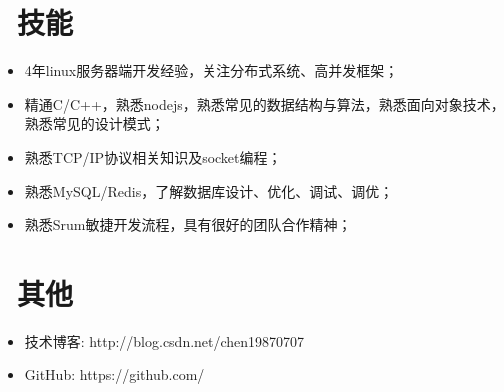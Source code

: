 \documentclass{resume}
\begin{document}

\section{\faCogs\ 技能}
\begin{itemize}[parsep=0.5ex]
  \item 4年linux服务器端开发经验，关注分布式系统、高并发框架；
  \item 精通C/C++，熟悉nodejs，熟悉常见的数据结构与算法，熟悉面向对象技术，熟悉常见的设计模式；
  \item 熟悉TCP/IP协议相关知识及socket编程；
  \item 熟悉MySQL/Redis，了解数据库设计、优化、调试、调优；
  \item 熟悉Srum敏捷开发流程，具有很好的团队合作精神；
\end{itemize}

\section{\faInfo\ 其他}
\begin{itemize}[parsep=0.5ex]
  \item 技术博客: http://blog.csdn.net/chen19870707
  \item GitHub: https://github.com/
\end{itemize}

%
%
\end{document}
